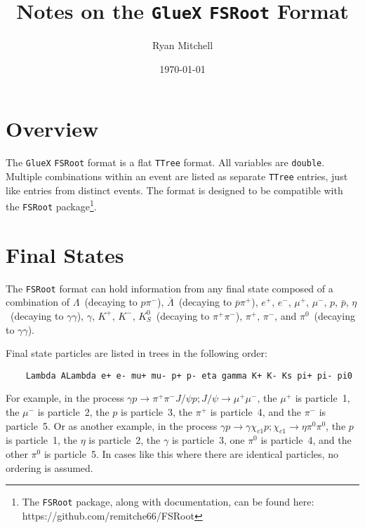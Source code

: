 \documentclass[11pt]{article}
\begin{document}
\title{Notes on the {\tt GlueX} {\tt FSRoot} Format}
\author{Ryan Mitchell}
\date{\today}
\maketitle



\tableofcontents

\parindent 0pt
\parskip 10pt

\section{Overview}

The {\tt GlueX} {\tt FSRoot} format is a flat {\tt TTree} format.  All variables are {\tt double}.  Multiple combinations within an event are listed as separate {\tt TTree} entries, just like entries from distinct events.  The format is designed to be compatible with the {\tt FSRoot} package\footnote{The {\tt FSRoot} package, along with documentation, can be found here: https://github.com/remitche66/FSRoot}.


\section{Final States}
\label{sec:fs}

The {\tt FSRoot} format can hold information from any final state composed of a combination of $\Lambda$~(decaying to $p\pi^-$), $\overline\Lambda$~(decaying to $\overline{p}\pi^+$), $e^+$, $e^-$, $\mu^+$, $\mu^-$, $p$, $\bar{p}$, $\eta$~(decaying to $\gamma\gamma$), $\gamma$, $K^+$, $K^-$,
$K^0_S$~(decaying to $\pi^+\pi^-$), $\pi^+$, $\pi^-$, and $\pi^0$~(decaying to $\gamma\gamma$).

Final state particles are listed in trees in the following order:
\begin{verbatim}
    Lambda ALambda e+ e- mu+ mu- p+ p- eta gamma K+ K- Ks pi+ pi- pi0
\end{verbatim}
For example, in the process $\gamma p\to\pi^+\pi^-J/\psi p; J/\psi\to\mu^+\mu^-$, the $\mu^+$ is particle~1, the $\mu^-$ is particle~2, the $p$ is particle~3, the $\pi^+$ is particle~4, and the $\pi^-$ is particle~5. Or as another example, in the process $\gamma p\to\gamma\chi_{c1}p; \chi_{c1}\to\eta\pi^0\pi^0$, the $p$ is particle~1, the $\eta$ is particle~2, the $\gamma$ is particle~3, one $\pi^0$ is particle~4, and the other $\pi^0$ is particle~5.  In cases like this where there are identical particles, no ordering is assumed.
\end{document}
